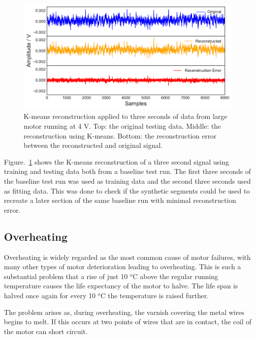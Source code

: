 \begin{figure}[t]
    \includegraphics[width=1.0\textwidth]{fig/kmeans_large_4Vnowater.pdf}
    \caption[K-means Large Motor Reconstruction No Water]{K-means reconstruction applied to three seconds of data from large motor running at 4 V. Top: the original testing data. Middle: the reconstruction using K-means. Bottom: the reconstruction error between the reconstructed and original signal.}
    \label{fig:kmeans_large4V}
\end{figure}

Figure.~\ref{fig:kmeans_large4V} shows the K-means reconstruction of a three second signal using training and testing data both from a baseline test run. The first three seconds of the baseline test run was used as training data and the second three seconds used as fitting data. This was done to check if the synthetic segments could be used to recreate a later section of the same baseline run with minimal reconstruction error. 

\subsection{Overheating}

Overheating is widely regarded as the most common cause of motor failures, with many other types of motor deterioration leading to overheating. This is such a substantial problem that a rise of just 10 $^o$C above the regular running temperature causes the life expectancy of the motor to halve. The life span is halved once again for every 10 $^o$C the temperature is raised further.

The problem arises as, during overheating, the varnish covering the metal wires begins to melt. If this occurs at two points of wires that are in contact, the coil of the motor can short circuit.

